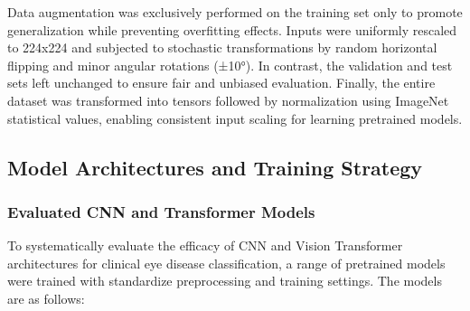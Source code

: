 \documentclass[conference,9pt]{IEEEtran}
\begin{document}
Data augmentation was exclusively performed on the training set only to promote generalization while preventing overfitting effects. Inputs were uniformly rescaled to 224x224 and subjected to stochastic transformations by random horizontal flipping and minor angular rotations (±10°). In contrast, the validation and test sets left unchanged to ensure fair and unbiased evaluation. Finally, the entire dataset was transformed into tensors followed by normalization using ImageNet statistical values, enabling consistent input scaling for learning pretrained models.

\subsection{\textbf{Model Architectures and Training Strategy}}


\subsubsection{\textbf{Evaluated CNN and Transformer Models}}

To systematically evaluate the efficacy of CNN \cite{resnet} and Vision Transformer architectures \cite{vit,swin,mobilevit,levit}  for clinical eye disease classification, a range of pretrained models were trained with standardize preprocessing and training settings. The models are as follows:
\end{document}
